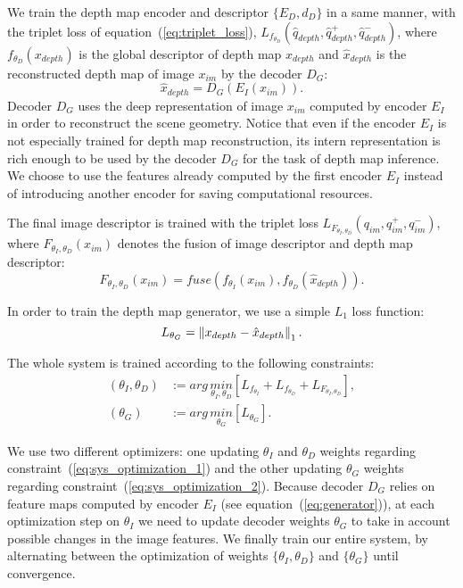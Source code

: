 We train the depth map encoder and descriptor $\{E_D, d_D\}$ in a same manner, with the triplet loss of equation~(\ref{eq:triplet_loss}), $L_{f_{\theta_{D}}}(\hat{q}_{depth}, \hat{q}_{depth}^+, \hat{q}_{depth}^-)$, where $f_{\theta_{D}}(x_{depth})$ is the global descriptor of depth map $x_{depth}$ and $\hat{x}_{depth}$ is the reconstructed depth map of image $x_{im}$ by the decoder $D_G$:
\begin{equation}
	\label{eq:generator}
	\hat{x}_{depth} = D_G(E_I(x_{im})).
\end{equation}
Decoder $D_G$ uses the deep representation of image $x_{im}$ computed by encoder $E_I$ in order to reconstruct the scene geometry. Notice that even if the encoder $E_I$ is not especially trained for depth map reconstruction, its intern representation is rich enough to be used by the decoder $D_G$ for the task of depth map inference. We choose to use the features already computed by the first encoder $E_I$ instead of introducing another encoder for saving computational resources.

The final image descriptor is trained with the triplet loss $L_{F_{\theta_{I}, \theta_{D}}}({q}_{im}, {q}_{im}^+, {q}_{im}^-)$, where $F_{\theta_{I},\theta_{D}}(x_{im})$ denotes the fusion of image descriptor and depth map descriptor: 
\begin{equation}
	\label{eq:desc_fuse}
	F_{\theta_{I},\theta_{D}}(x_{im}) = fuse \left( f_{\theta_{I}}(x_{im}), f_{\theta_{D}}(\hat{x}_{depth}) \right).
\end{equation}

In order to train the depth map generator, we use a simple $L_1$ loss function:
\begin{equation}
 \label{eq:l1_loss}
	L_{\theta_{G}} = \left\lVert x_{depth} - \hat{x}_{depth}\right\rVert_{1}.
\end{equation}

The whole system is trained according to the following constraints:
\begin{align}
	\left( \theta_{I}, \theta_{D} \right) & := arg\,\underset{\theta_{I}, \theta_{D}}{min} \left[ L_{f_{\theta_{I}}} + L_{f_{\theta_{D}}} + L_{F_{\theta_{I},\theta_{D}}} \right], \label{eq:sys_optimization_1} \\ 	
	\left( \theta_{G} \right) & := arg\,\underset{\theta_{G}}{min} \left[ L_{\theta_{G}} \right]. 	\label{eq:sys_optimization_2}
\end{align}

We use two different optimizers: one updating $\theta_{I}$ and $\theta_{D}$ weights regarding constraint~(\ref{eq:sys_optimization_1}) and the other updating $\theta_{G}$ weights regarding constraint~(\ref{eq:sys_optimization_2}). Because decoder $D_G$ relies on feature maps computed by encoder $E_I$ (see equation~(\ref{eq:generator})), at each optimization step on $\theta_{I}$ we need to update decoder weights $\theta_{G}$ to take in account possible changes in the image features. We finally train our entire system, by alternating between the optimization of weights $\{\theta_{I}, \theta_{D}\}$ and $\{\theta_G\}$ until convergence.


